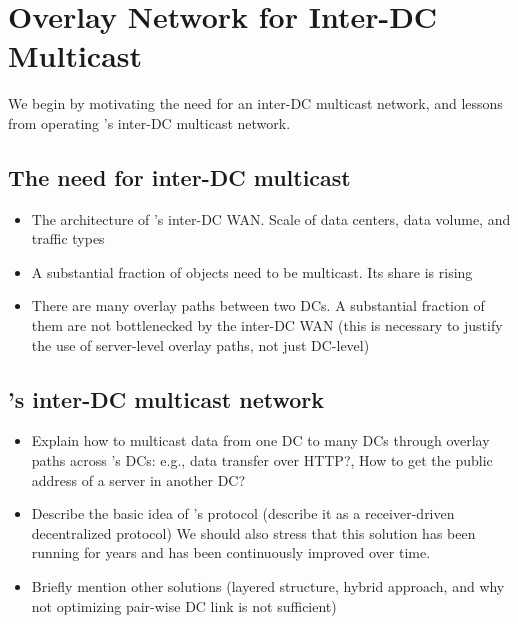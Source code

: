 \section{Overlay Network for Inter-DC Multicast}


We begin by motivating the need for an inter-DC multicast network, and lessons from operating \company's inter-DC multicast network.

\subsection{The need for inter-DC multicast}

\begin{itemize}

\item The architecture of \company's inter-DC WAN. Scale of data centers, data volume, and traffic types

\item A substantial fraction of objects need to be multicast. Its share is rising

\item There are many overlay paths between two DCs. A substantial fraction of them are not bottlenecked by the inter-DC WAN (this is necessary to justify the use of server-level overlay paths, not just DC-level)

\end{itemize}

\subsection{\company's inter-DC multicast network}
\begin{itemize}

\item Explain how to multicast data from one DC to many DCs through overlay paths across \company's DCs: e.g., data transfer over HTTP?, How to get the public address of a server in another DC? 

\item Describe the basic idea of \company's protocol (describe it as a receiver-driven decentralized protocol)
We should also stress that this solution has been running for \fillme years and has been continuously improved over time.

\item Briefly mention other solutions (layered structure, hybrid approach, and why not optimizing pair-wise DC link is not sufficient)

\end{itemize}

